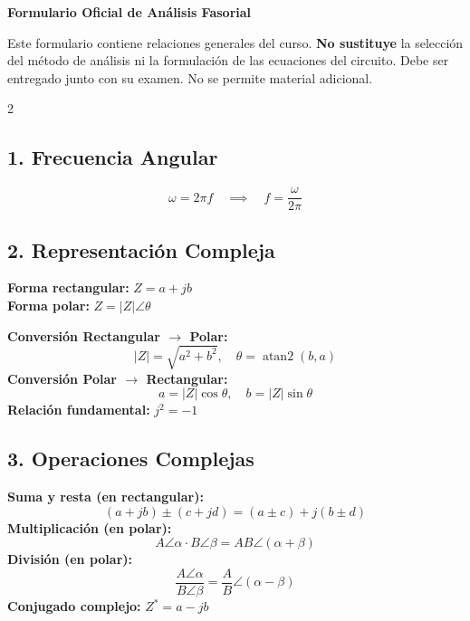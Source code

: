 \documentclass[10pt, a4paper]{article}
\begin{document}
\begin{center}
    \Large\textbf{\textcolor{ucbblue}{Formulario Oficial de Análisis Fasorial}}
\end{center}

\begin{tcolorbox}[colback=yellow!10, colframe=ucbblue, title=\textbf{Instrucciones de Uso Permitido}]
    \small Este formulario contiene relaciones generales del curso. \textbf{No sustituye} la selección del método de análisis ni la formulación de las ecuaciones del circuito. Debe ser entregado junto con su examen. No se permite material adicional.
\end{tcolorbox}

\begin{multicols*}{2}

\subsection*{1. Frecuencia Angular}
\begin{equation*}
    \boxed{\omega = 2\pi f} \quad \implies \quad f = \frac{\omega}{2\pi}
\end{equation*}

\subsection*{2. Representación Compleja}
\textbf{Forma rectangular:} $\boxed{Z = a + jb}$ \\
\textbf{Forma polar:} $\boxed{Z = |Z|\angle\theta}$

\vspace{0.2cm}
\textbf{Conversión Rectangular $\rightarrow$ Polar:}
\begin{equation*}
    |Z| = \sqrt{a^2 + b^2}, \quad \theta = \operatorname{atan2}(b,a)
\end{equation*}
\textbf{Conversión Polar $\rightarrow$ Rectangular:}
\begin{equation*}
    a = |Z|\cos\theta, \quad b = |Z|\sin\theta
\end{equation*}
\textbf{Relación fundamental:} $\boxed{j^2 = -1}$

\subsection*{3. Operaciones Complejas}
\textbf{Suma y resta (en rectangular):}
\begin{equation*}
    (a+jb) \pm (c+jd) = (a\pm c) + j(b\pm d)
\end{equation*}
\textbf{Multiplicación (en polar):}
\begin{equation*}
    A\angle\alpha \cdot B\angle\beta = AB\angle(\alpha+\beta)
\end{equation*}
\textbf{División (en polar):}
\begin{equation*}
    \frac{A\angle\alpha}{B\angle\beta} = \frac{A}{B}\angle(\alpha-\beta)
\end{equation*}
\textbf{Conjugado complejo:} $\boxed{Z^* = a - jb}$


\end{multicols*}
\end{document}
